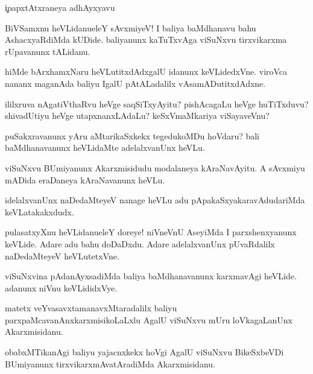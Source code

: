 \c{ipapxtAtxraneya adhAyxyavu}

\begin{mng}
BiVSamxnu heVLidanu\mdash eleY sAvxmiyeV! I baliya baMdhanavu bahu AshacxyaRdiMda kUDide. baliyanunx kaTuTxvAga viSuNxvu tirxvikarxma rUpavanunx tALidanu.
\end{mng}

\begin{mng}
hiMde bArxhamxNaru heVLutitxdAdxgalU idanunx keVLidedxVne. viroVca nananx maganAda baliyu IgalU pAtALadalilx vAsamADutitxdAdxne.
\end{mng}

\begin{mng}
ililxruva nAgatiVthaRvu heVge saqSiTxyAyitu? pishAcagaLu heVge huTiTxduvu? shivadUtiyu heVge utapxnanxLAdaLu? keSxVmaMkariya viSayaveVnu?
\end{mng}

\begin{mng}
puSakxravanunx yAru aMtarikaSxkekx tegedukoMDu hoVdaru? bali baMdhanavanunx heVLidaMte adelalxvanUnx heVLu.
\end{mng}

\begin{mng}
viSuNxvu BUmiyanunx Akarxmisidudu modalaneya kAraNavAyitu. A sAvxmiyu mADida eraDaneya kAraNavanunx heVLu.
\end{mng}

\begin{mng}
idelalxvanUnx naDedaMteyeV nanage heVLu adu pApakaSxyakaravAdudariMda keVLatakakxdudx.
\end{mng}

\begin{mng}
pulasatxyXnu heVLidanu\mdash eleY doreye! niVneVnU AseyiMda I parxshenxyanunx keVLide. Adare adu bahu doDaDxdu. Adare adelalxvanUnx pUvaRdalilx naDedaMteyeV heVLutetxVne.
\end{mng}

\begin{mng}
viSuNxvina pAdanAyxsadiMda baliya baMdhanavanunx karxmavAgi heVLide. adanunx niVnu keVLididxVye.
\end{mng}

\begin{mng}
matetx veYvasavxtamanavxMtaradalilx baliyu parxpaMcavanAnxkarxmisikoLaLxlu AgalU viSuNxvu mUru loVkagaLanUnx Akarxmisidanu.
\end{mng}

\begin{mng}
obabxMTikanAgi baliyu yajacnxkekx hoVgi AgalU viSuNxvu BikeSxbeVDi BUmiyanunx tirxvikarxmAvatAradiMda Akarxmisidanu.
\end{mng}

